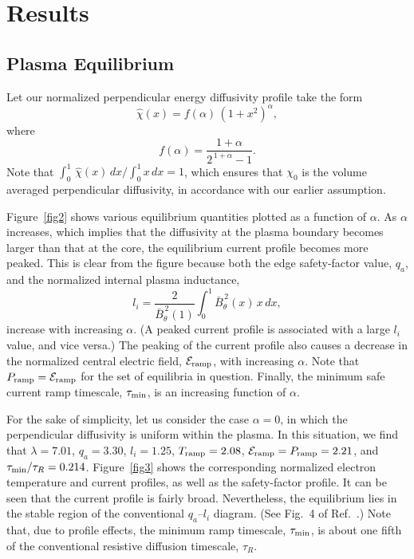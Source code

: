\documentclass[12pt,prb,aps]{revtex4-1}
\begin{document}
\section{Results}
\subsection{Plasma Equilibrium}
Let our normalized perpendicular energy diffusivity profile take the form
\begin{equation}
\hat{\chi}(x) = f(\alpha)\,(1+x^2)^\alpha,
\end{equation}
where
\begin{equation}
f(\alpha) = \frac{1+\alpha}{2^{\,1+\alpha}-1}.
\end{equation}
Note that $\int_0^1\,\hat{\chi}(x)\,dx/\int_0^1x\,dx=1$, which ensures that $\chi_0$ is the volume averaged perpendicular diffusivity, in accordance with our earlier assumption. 

Figure~\ref{fig2} shows various equilibrium quantities plotted as a function of $\alpha$. As $\alpha$ increases, which implies that the diffusivity at the plasma
boundary becomes larger than that at the core, the equilibrium current profile becomes more peaked. This is clear from the figure because both the edge safety-factor
value, $q_a$, and the normalized internal plasma inductance,\cite{cheng}
\begin{equation}
l_i= \frac{2}{\bar{B}_\theta^{\,2}(1)}\int_0^1\bar{B}_\theta^{\,2}(x)\,x\,dx,
\end{equation}
increase with increasing $\alpha$. (A peaked current profile is associated with a large $l_i$ value, and vice versa.) The peaking of the current profile also causes a decrease in the normalized central electric field, ${\cal E}_{\rm ramp}$,  with increasing $\alpha$. 
Note that $P_{\rm ramp}= {\cal E}_{\rm ramp}$ for the set of equilibria in question. Finally, the minimum safe current ramp timescale, $\tau_{\rm min}$,  is an increasing function of $\alpha$. 

For the sake of simplicity, let us consider the case $\alpha=0$, in which the perpendicular diffusivity is uniform within the plasma. In this situation,
we find that 
$\lambda =  7.01$,  $q_a    =  3.30$,   $l_i   =  1.25$, 
$T_{\rm ramp} =  2.08$,  ${\cal E}_{\rm ramp}=P_{\rm ramp}  =  2.21$, and $\tau_{\rm min}/\tau_R =  0.214$. 
Figure~\ref{fig3} shows the corresponding normalized electron temperature and current profiles, as well as the safety-factor profile. 
It can be seen that the current profile is fairly broad. Nevertheless, the equilibrium lies in the stable region of the
conventional $q_a$--$l_i$ diagram. (See Fig.~4 of Ref.~.) Note that, due to profile effects,  the minimum ramp timescale,
$\tau_{\rm min}$,  is about one fifth of the conventional
resistive diffusion timescale, $\tau_R$. 
\end{document}
